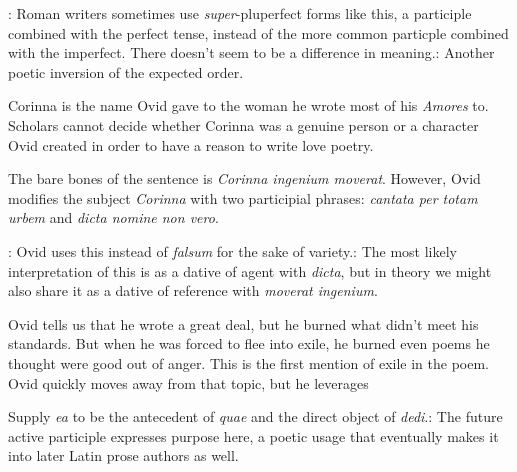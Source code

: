 
: Roman writers sometimes use \textit{super}-pluperfect
forms like this, a participle combined with the perfect tense, instead of the
more common particple combined with the imperfect.  There doesn't seem to be
a difference in meaning.\indent{}: Another poetic inversion of
the expected order.


Corinna is the name Ovid gave to the woman he wrote most of his \textit{Amores}
to.  Scholars cannot decide whether Corinna was a genuine person or a character
Ovid created in order to have a reason to write love poetry.

The bare bones of the sentence is \textit{Corinna ingenium moverat}.  However,
Ovid modifies the subject \textit{Corinna} with two participial phrases:
\textit{cantata per totam urbem} and \textit{dicta nomine non vero}.


: Ovid uses this instead of \textit{falsum} for the sake of
variety.\indent{}: The most likely interpretation of this is as
a dative of agent with \textit{dicta}, but in theory we might also share it
as a dative of reference with \textit{moverat ingenium}.


Ovid tells us that he wrote a great deal, but he burned what didn't meet his
standards.  But when he was forced to flee into exile, he burned even poems he
thought were good out of anger.  This is the first mention of exile in the
poem.  Ovid quickly moves away from that topic, but he leverages 

Supply \textit{ea} to be the antecedent of \textit{quae} and the direct object
of \textit{dedi}.\indent{}: The future active participle
expresses purpose here, a poetic usage that eventually makes it into later
Latin prose authors as well.
